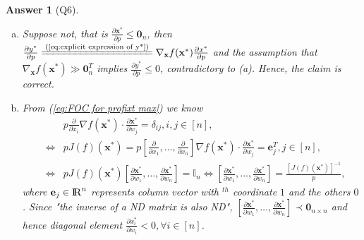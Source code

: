 \documentclass{article}
\newtheorem*{ans}{Answer}
\newcommand {\Reals}  {{\rm I \! R}}
\newcommand{\1}{{\bf 1}}
\newcommand{\bbI}{\mathbb{I}}
\newcommand{\0}{{\mathbf{0}}}
\newcommand{\e}{{\mathbf{e}}}
\newcommand{\x}{{\mathbf{x}}}
\newcommand{\<}{\langle}
\renewcommand{\>}{\rangle}
\begin{document}
\begin{ans}[Q6]
\begin{enumerate}[(a)]
\begin{proof}
		First case definitely leads to $\left[\frac{ \partial \x^*}{\partial p}\right]^T J(f) \left( \x^* \right) = \0_n^T$; namely, first case is impossible. In second case, we can still get $\left[\frac{ \partial \x^*}{\partial p}\right]^T J(f) \left( \x^* \right) = \0_n^T$; namely, second case is impossible.
		
		As a result, we proved the lemma.
\end{proof}
		\item 	Suppose not, that is $\frac{\partial \x^*}{\partial p} \le \0_n$, then $\frac{\partial y^*}{\partial p} \xlongequal{\text{(\ref{eq:explicit expression of y*})}} \nabla_{\x} f(\x^*) \frac{\partial x^*}{\partial p}$ and the assumption that $\nabla_{\x} f(\x^*) \gg \0_n^T$ implies $\frac{\partial y^*}{\partial p} \le 0$, contradictory to (a). Hence, the claim is correct.
		\item From (\ref{eq:FOC for profixt max}) we know
\begin{eqnarray*}
&&		p \frac{\partial }{\partial x_i} \nabla f(\x^*) \cdot \frac{\partial \x^*}{\partial w_j} = \delta_{ij}, i,j \in [n], \\
& \Leftrightarrow & p J(f)(\x^*) = p \left[\frac{\partial }{\partial x_1}, \ldots, \frac{\partial }{\partial x_n}\right] \nabla f(\x^*) \cdot \frac{\partial \x^*}{\partial w_j} = \e_j^T,j\in [n], \\
& \Leftrightarrow & p J(f)(\x^*) \left[ \frac{\partial \x^*}{\partial w_1},\ldots,\frac{\partial \x^*}{\partial w_n} \right]= \bbI_n \Leftrightarrow  \left[ \frac{\partial \x^*}{\partial w_1},\ldots,\frac{\partial \x^*}{\partial w_n} \right]= \frac{ \left[J(f)(\x^*)\right]^{-1}}p,
\end{eqnarray*}
where $\e_j \in \Reals^n$ represents column vector with $^{th}$ coordinate $1$ and the others $0$. Since "the inverse of a ND matrix is also ND", $\left[ \frac{\partial \x^*}{\partial w_1},\ldots,\frac{\partial \x^*}{\partial w_n} \right] \prec \0_{n \times n}$ and hence diagonal element $\frac{\partial x^*_i}{\partial w_i} <0,\forall i\in [n]$.
	\end{enumerate}
\end{ans}
\end{document}
